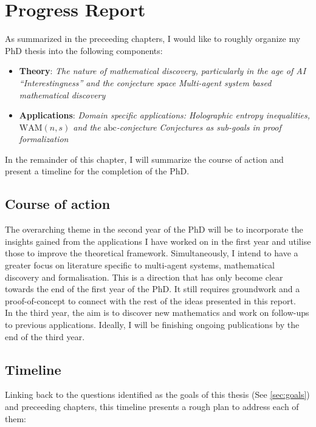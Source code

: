 \chapter{Progress Report}
\label{chap:progress}
As summarized in the preceeding chapters, I would like to roughly organize my PhD thesis into the following components:
\begin{itemize}
    \item \textbf{Theory}:
        \subitem \textit{The nature of mathematical discovery, particularly in the age of AI}
        \subitem \textit{``Interestingness'' and the conjecture space}
        \subitem \textit{Multi-agent system based mathematical discovery}
    \item \textbf{Applications}:
        \subitem \textit{Domain specific applications: Holographic entropy inequalities, $\text{WAM}(n,s)$ and the $\text{abc}$-conjecture}
        \subitem \textit{Conjectures as sub-goals in proof formalization} 
\end{itemize}
In the remainder of this chapter, I will summarize the course of action and present a timeline for the completion of the PhD.

\section{Course of action}
The overarching theme in the second year of the PhD will be to incorporate the insights gained from the applications I have worked on in the first year
and utilise those to improve the theoretical framework. Simultaneously, I intend to have a greater focus on literature specific to multi-agent systems, mathematical discovery and formalisation. This is a direction that has only become clear towards the end of the first year of the PhD. It still requires groundwork and a proof-of-concept to connect with the rest of the ideas presented in this report.
\\ In the third year, the aim is to discover new mathematics and work on follow-ups to previous applications. Ideally, I will be finishing ongoing publications by the end of the third year.

\section{Timeline}
Linking back to the questions identified as the goals of this thesis (See \ref{sec:goals}) and preceeding chapters, this timeline presents a rough plan to address each of them:

